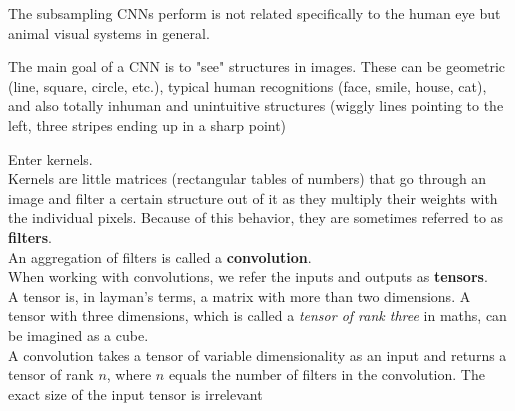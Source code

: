 The subsampling CNNs perform is not related specifically to the human eye but animal visual systems in general.  \cite{MasakazuMatsugu2003}  

The main goal of a CNN is to "see" structures in images.  
These can be geometric (line, square, circle, etc.),  
typical human recognitions (face, smile, house, cat),  
and also totally inhuman and unintuitive structures (wiggly lines pointing to the left, three stripes ending up in a sharp point)

Enter kernels.  \\
Kernels are little matrices (rectangular tables of numbers) that go through an image and filter a certain structure out of it as they multiply their weights with the individual pixels. Because of this behavior, they are sometimes referred to as \textbf{filters}. \\

An aggregation of filters is called a \textbf{convolution}. \\
When working with convolutions, we refer the inputs and outputs as \textbf{tensors}.\\
A tensor is, in layman's terms, a matrix with more than two dimensions. A tensor with three dimensions, which is called a \emph{tensor of rank three} in maths, can be imagined as a cube.\\
A convolution takes a tensor of variable dimensionality as an input and returns a tensor of rank $n$, where $n$ equals the number of filters in the convolution. The exact size of the input tensor is irrelevant